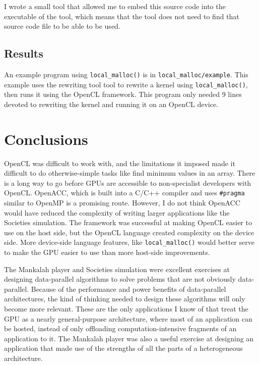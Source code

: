 \documentclass{article}
\begin{document}
I wrote a small tool that allowed me to embed this source code into the executable of the tool, which means that the tool does not need to find that source code file to be able to be used.

\subsection{Results}
An example program using \texttt{local\_malloc()} is in \texttt{local\_malloc/example}. This example uses the rewriting tool tool to rewrite a kernel using \texttt{local\_malloc()}, then runs it using the OpenCL framework. This program only needed 9 lines devoted to rewriting the kernel and running it on an OpenCL device.

\section{Conclusions}
OpenCL was difficult to work with, and the limitations it imposed made it difficult to do otherwise-simple tasks like find minimum values in an array. There is a long way to go before GPUs are accessible to non-specialist developers with OpenCL. OpenACC, which is built into a C/C++ compiler and uses \texttt{\#pragma} similar to OpenMP is a promising route. However, I do not think OpenACC would have reduced the complexity of writing larger applications like the Societies simulation. The framework was successful at making OpenCL easier to use on the host side, but the OpenCL language created complexity on the device side. More device-side language features, like \texttt{local\_malloc()} would better serve to make the GPU easier to use than more host-side improvements.

The Mankalah player and Societies simulation were excellent exercises at designing data-parallel algorithms to solve problems that are not obviously data-parallel. Because of the performance and power benefits of data-parallel architectures, the kind of thinking needed to design these algorithms will only become more relevant. These are the only applications I know of that treat the GPU as a nearly general-purpose architecture, where most of an application can be hosted, instead of only offloading computation-intensive fragments of an application to it. The Mankalah player was also a useful exercise at designing an application that made use of the strengths of all the parts of a heterogeneous architecture. 

\end{document}
